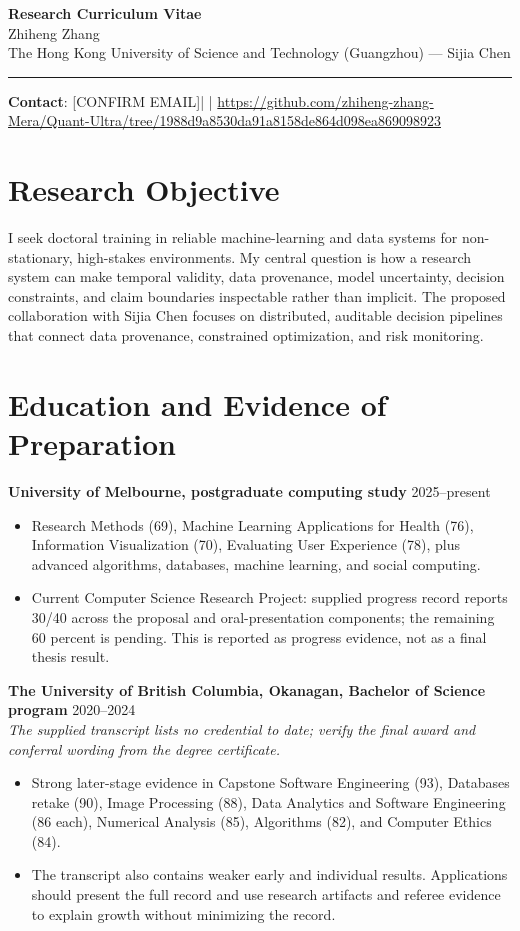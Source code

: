 \documentclass[11pt]{article}
\newcommand{\ApplicantName}{Zhiheng Zhang}
\newcommand{\ApplicantEmail}{[CONFIRM EMAIL]}
\newcommand{\ApplicantPhone}{[CONFIRM PHONE]}
\newcommand{\ApplicantGitHub}{\url{https://github.com/zhiheng-zhang-Mera/Quant-Ultra/tree/1988d9a8530da91a8158de864d098ea869098923}}
\begin{document}
\begin{center}
{\LARGE\bfseries Research Curriculum Vitae}\\[0.25em]
{\large \ApplicantName}\\
The Hong Kong University of Science and Technology (Guangzhou) --- Sijia Chen
\end{center}
\vspace{0.35em}\hrule\vspace{0.65em}

\textbf{Contact}: \ApplicantEmail\quad | \quad \ApplicantPhone\quad | \quad \ApplicantGitHub

\section*{Research Objective}
I seek doctoral training in reliable machine-learning and data systems for non-stationary, high-stakes environments. My central question is how a research system can make temporal validity, data provenance, model uncertainty, decision constraints, and claim boundaries inspectable rather than implicit. The proposed collaboration with Sijia Chen focuses on distributed, auditable decision pipelines that connect data provenance, constrained optimization, and risk monitoring.

\section*{Education and Evidence of Preparation}
\textbf{University of Melbourne, postgraduate computing study} \hfill 2025--present
\begin{itemize}
\item Research Methods (69), Machine Learning Applications for Health (76), Information Visualization (70), Evaluating User Experience (78), plus advanced algorithms, databases, machine learning, and social computing.
\item Current Computer Science Research Project: supplied progress record reports 30/40 across the proposal and oral-presentation components; the remaining 60 percent is pending. This is reported as progress evidence, not as a final thesis result.
\end{itemize}

\textbf{The University of British Columbia, Okanagan, Bachelor of Science program} \hfill 2020--2024\\
\textit{The supplied transcript lists no credential to date; verify the final award and conferral wording from the degree certificate.}
\begin{itemize}
\item Strong later-stage evidence in Capstone Software Engineering (93), Databases retake (90), Image Processing (88), Data Analytics and Software Engineering (86 each), Numerical Analysis (85), Algorithms (82), and Computer Ethics (84).
\item The transcript also contains weaker early and individual results. Applications should present the full record and use research artifacts and referee evidence to explain growth without minimizing the record.
\end{itemize}
\end{document}
